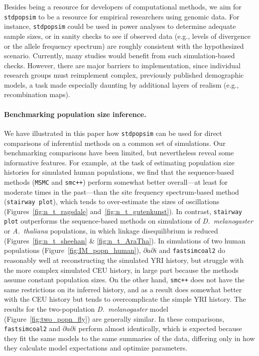 \documentclass[12pt,halfline,a4paper]{ouparticle}
\newcommand{\stdpopsim}{\texttt{stdpopsim}\xspace}
\newcommand{\dadi}{$\partial a \partial i$\xspace}
\newcommand{\MSMC}{\texttt{MSMC}\xspace}
\newcommand{\smcpp}{\texttt{smc++}\xspace}
\newcommand{\stairwayplot}{\texttt{stairway plot}\xspace}
\newcommand{\fastsimcoal}{\texttt{fastsimcoal2}\xspace}
\begin{document}
Besides being a resource for developers of computational methods,
we aim for \stdpopsim to be a resource for empirical researchers using genomic data.
For instance, \stdpopsim could be used in power analyses to determine adequate sample sizes,
or in sanity checks to see if observed data
(e.g., levels of divergence or the allele frequency spectrum)
are roughly consistent with the hypothesized scenario.
Currently, many studies would benefit from such simulation-based checks.
However,  there are major barriers to implementation,
since individual research groups must reimplement complex, previously published demographic models,
a task made especially daunting by additional layers of realism (e.g., recombination maps).

\paragraph{Benchmarking population size inference.}
We have illustrated in this paper how \stdpopsim can be used for direct
comparisons of inferential methods on a common set of simulations. Our
benchmarking comparisons have been limited, but nevertheless
reveal some informative features.
For example, at the task of estimating population size histories for simulated human
populations, we find that the sequence-based methods (\MSMC and \smcpp)
perform somewhat better overall---at least for moderate times in the past---than
the site frequency spectrum-based method (\stairwayplot),
which tends to over-estimate the sizes of oscillations
(Figures~\ref{fig:n_t_ragsdale} and~\ref{fig:n_t_gutenkunst}).
In contrast, \stairwayplot outperforms the sequence-based methods
on simulations of \textit{D.~melanogaster} or \textit{A.~thaliana} populations,
in which linkage disequilibrium is reduced (Figures~\ref{fig:n_t_sheehan} \& \ref{fig:n_t_AraTha}).
In simulations of two human populations
(Figure~\ref{fig:IM_popn_human}), \dadi and \fastsimcoal do reasonably well at
reconstructing the simulated YRI history, but struggle with the more complex simulated CEU
history, in large part because the methods assume constant population sizes.
On the other hand, \smcpp does not have the same
restrictions on its inferred history, and as a result does somewhat better
with the CEU history but tends to overcomplicate the simple YRI history.
The results for
the two-population \textit{D.~melanogaster} model (Figure~\ref{fig:two_popn_fly})
are generally similar.
In these comparisons, \fastsimcoal and \dadi perform almost identically, which is expected because they fit the same models to the same summaries of the data, differing only in how they calculate model expectations and optimize parameters.
\end{document}
